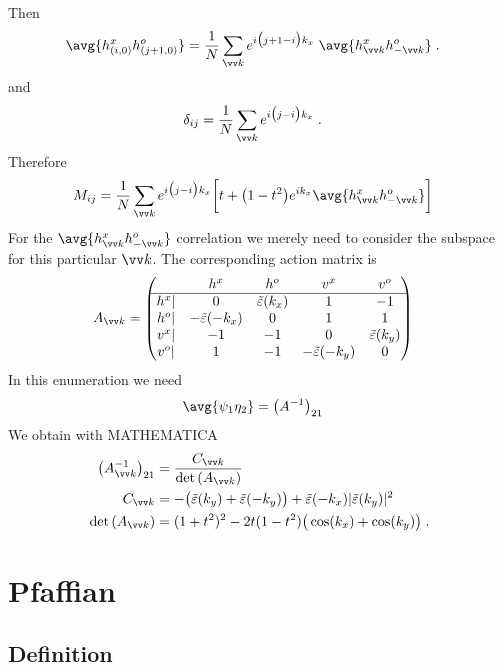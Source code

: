 Then 
%
\begin{align*}
\avg{\hdag{(i,0)} \hnag{(j+1,0)}} &=
\frac{1}{N}\sum_{ \vv k}
e^{i\big(j +1 -  i\big) k_{x}}\;
\avg{\hdag{\vv k} \hnag{- \vv k}}\;.
\end{align*}
%
and
%
\begin{align*}
\delta_{ij} &= 
\frac{1}{N}\sum_{ \vv k}
e^{i\big(j  -  i\big) k_{x}}\;.
\end{align*}
%
Therefore
%
\begin{align*}
M_{ij} &= \frac{1}{N}\sum_{ \vv k}
e^{i\big(j  -  i\big) k_{x}}
\bigg[ t + \big(1-t^{2}\big) e^{i k_{x}} \avg{\hdag{\vv k} \hnag{- \vv k}} \bigg]
\end{align*}
%
For the $\avg{\hdag{\vv k} \hnag{ -\vv k}}$ correlation we merely need to consider the subspace for this particular $\vv k$. The corresponding
action matrix is
%
\begin{align*}
A_{\vv k}&=
\begin{pmatrix}
&h^{x}& h^{o}& v^{x} & v^{o}\\
\hline
h^{x}|&	0 & \tilde \varepsilon(k_{x}) & 1 & -1\\
h^{o}|&	-\tilde \varepsilon(-k_{x}) & 0  & 1 & 1\\
v^{x}|&	-1 & -1 & 0 & \tilde \varepsilon(k_{y})\\
v^{o}|&	1 & -1 & -\tilde \varepsilon(-k_{y}) & 0
\end{pmatrix}
\end{align*}
%
In this enumeration we need 
%
\begin{align*}
\avg{\psi_{1}\eta_{2}} &=\big(A^{-1}\big)_{21}
\end{align*}
We obtain with MATHEMATICA
\begin{align*}
\big(A_{\vv k}^{-1}\big)_{21} &= \frac{C_{\vv k}}{\Det{A_{\vv k}}}\\
C_{\vv k} &= - \big(\tilde \varepsilon(k_{y}) + \tilde \varepsilon(-k_{y})\big)
 +\tilde \varepsilon(-k_{x}) |\tilde \varepsilon(k_{y})|^{2} \\
\Det{A_{\vv k}} &= (1 + t^2)^2 - 2 t (1 - t^2) \big(\cos(k_{x})+\cos(k_{y})\big)\;.
\end{align*}
%




%
\section{Pfaffian}
\subsection{Definition}

